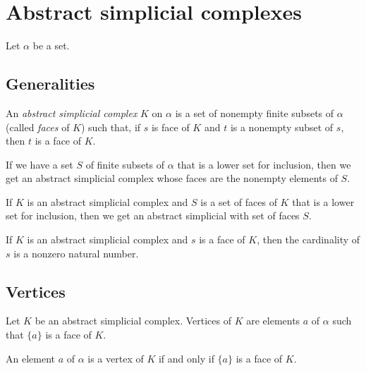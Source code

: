 \section{Abstract simplicial complexes}

Let $\alpha$ be a set.

\subsection{Generalities}

\begin{subdefi}[AbstractSimplicialComplex]
An \emph{abstract simplicial complex} $K$ on $\alpha$ is a set of nonempty finite subsets of $\alpha$ (called \emph{faces} of $K$) such that, if
$s$ is face of $K$ and $t$ is a nonempty subset of $s$, then $t$ is a face of $K$.
\end{subdefi}

\begin{subdefi}[of\_erase]
If we have a set $S$ of finite subsets of $\alpha$ that is a lower set for inclusion, then we get an abstract simplicial complex whose faces
are the nonempty elements of $S$.

\end{subdefi}

\begin{subdefi}[of\_subcomplex]
If $K$ is an abstract simplicial complex and $S$ is a set of faces of $K$ that is a lower set for inclusion, then we get an abstract simplicial with
set of faces $S$.

\end{subdefi}

\begin{sublemma}
If $K$ is an abstract simplicial complex and $s$ is a face of $K$, then the cardinality of $s$ is a nonzero natural number.

\end{sublemma}

\subsection{Vertices}

\begin{subdefi}[vertices]
Let $K$ be an abstract simplicial complex. Vertices of $K$ are elements $a$ of $\alpha$ such that $\{a\}$ is a face of $K$.

\end{subdefi}

\begin{sublemma}
An element $a$ of $\alpha$ is a vertex of $K$ if and only if $\{a\}$ is a face of $K$.

\end{sublemma}

